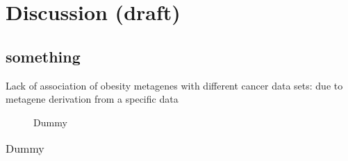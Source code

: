 \chapter{Discussion (draft)}

\section{something}



Lack of association of obesity metagenes with different cancer data sets: due to metagene derivation from a specific data


\begin{figure}[ht]
\caption{Dummy}
\label{fig:dum1}
\end{figure}

\begin{table}[ht]
\caption{Dummy}
\begin{tabular}{|c|c|}
\end{tabular}
\label{tab:dum1}
\end{table}
